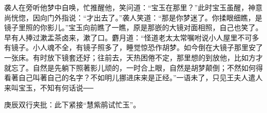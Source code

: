 \begin{parag}


    袭人在旁听他梦中自唤，忙推醒他，笑问道：“宝玉在那里？”此时宝玉虽醒，神意尚恍惚，因向门外指说：“才出去了。”袭人笑道：“那是你梦迷了。你揉眼细瞧，是镜子里照的你影儿。”宝玉向前瞧了一瞧，原是那嵌的大镜对面相照，自己也笑了。早有人捧过漱盂茶卤来，漱了口。麝月道：“怪道老太太常嘱咐说小人屋里不可多有镜子。小人魂不全，有镜子照多了，睡觉惊恐作胡梦。如今倒在大镜子那里安了一张床。有时放下镜套还好；往前去，天热困倦不定，那里想的到放他，比如方才就忘了。自然是先躺下照著影儿顽的，一时合上眼，自然是胡梦颠倒；不然如何得看著自己叫著自己的名字？不如明儿挪进床来是正经。”一语未了，只见王夫人遣人来叫宝玉，不知有何话说──\begin{note}庚辰双行夹批：此下紧接“慧紫鹃试忙玉”。\end{note}
\end{parag}
